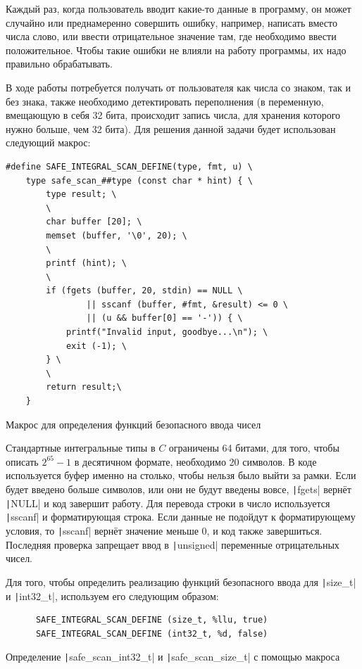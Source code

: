 \documentclass[a4paper]{article}
\begin{document}
  Каждый раз, когда пользователь вводит какие-то данные в программу, он может
  случайно или преднамеренно совершить ошибку, например, написать вместо числа
  слово, или ввести отрицательное значение там, где необходимо ввести положительное.
  Чтобы такие ошибки не влияли на работу программы, их надо правильно обрабатывать.

  В ходе работы потребуется получать от пользователя как числа со знаком, так и без
  знака, также необходимо детектировать переполнения (в переменную, вмещающую в себя
  32 бита, происходит запись числа, для хранения которого нужно больше, чем 32 бита).
  Для решения данной задачи будет использован следующий макрос:
  \begin{listing}[H]
    \begin{verbatim}
#define SAFE_INTEGRAL_SCAN_DEFINE(type, fmt, u) \
    type safe_scan_##type (const char * hint) { \
        type result; \
        \
        char buffer [20]; \
        memset (buffer, '\0', 20); \
        \
        printf (hint); \
        \
        if (fgets (buffer, 20, stdin) == NULL \
                || sscanf (buffer, #fmt, &result) <= 0 \
                || (u && buffer[0] == '-')) { \
            printf("Invalid input, goodbye...\n"); \
            exit (-1); \
        } \
        \
        return result;\
    }
    \end{verbatim}
    \caption{Макрос для определения функций безопасного ввода чисел}
  \end{listing} 

  Стандартные интегральные типы в $C$ ограничены 64 битами, для того, чтобы
  описать $2^{65} - 1$ в десятичном формате, необходимо 20 символов. В коде используется
  буфер именно на столько, чтобы нельзя было выйти за рамки. Если будет введено
  больше символов, или они не будут введены вовсе, \texttt|fgets| вернёт
  \texttt|NULL| и код завершит работу.
  Для перевода строки в число используется \texttt|sscanf| и форматирующая строка.
  Если данные не подойдут к форматирующему условия, то \texttt|sscanf| вернёт
  значение меньше 0, и код также завершиться.
  Последняя проверка запрещает ввод в \texttt|unsigned| переменные отрицательных чисел.

  Для того, чтобы определить реализацию функций безопасного ввода для
  \texttt|size_t| и \texttt|int32_t|, используем его следующим образом:
  \begin{listing}[H]
    \begin{verbatim}
      SAFE_INTEGRAL_SCAN_DEFINE (size_t, %llu, true)
      SAFE_INTEGRAL_SCAN_DEFINE (int32_t, %d, false)
    \end{verbatim}
    \caption{Определение \texttt|safe_scan_int32_t| и \texttt|safe_scan_size_t| с помощью макроса}
  \end{listing}
\end{document}
